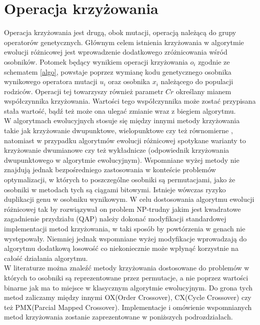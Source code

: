 \chapter{Operacja krzyżowania}\label{cha:pierwszyDokument}

Operacja krzyżowania jest drugą, obok mutacji, operacją należącą do grupy operatorów genetycznych. Głównym celem istnienia krzyżowania w algorytmie ewolucji różnicowej jest wprowadzenie dodatkowego zróżnicowania wśród osobników. Potomek będący wynikiem operacji krzyżowania $o_{i}$ zgodnie ze schematem \ref{algo}, powstaje poprzez wymianę kodu genetycznego osobnika wynikowego operatora mutacji $u_{i}$ oraz osobnika $x_{i}$ należącego do populacji rodziców. Operacji tej towarzyszy również parametr $C{r}$ określany mianem współczynnika krzyżowania. Wartości tego współczynnika może zostać przypisana stała wartość, bądź też może ona ulegać zmianie wraz z biegiem algorytmu. \\
W algorytmach ewolucyjnych stosuje się między innymi metody krzyżowania takie jak krzyżowanie dwupunktowe, wielopunktowe czy też równomierne \cite{diff2}, natomiast w przypadku algorytmów ewolucji różnicowej spotykane warianty to krzyżowanie dwumianowe czy też wykładnicze (odpowiednik krzyżowania dwupunktowego w algorytmie ewolucyjnym). Wspomniane wyżej metody nie znajdują jednak bezpośredniego zastosowania w konteście problemów optymalizacji, w których to poszczególne osobniki są permutacjami, jako że osobniki w metodach tych są ciągami bitowymi. Istnieje wówczas ryzyko duplikacji genu w osobniku wynikowym. W celu dostosowania algorytmu ewolucji różnicowej tak by rozwiązywał on problem NP-trudny jakim jest kwadratowe zagadnienie przydziału (QAP) należy dokonać modyfikacji standardowej implementacji metod krzyżowania, w taki sposób by powtórzenia w genach nie występowały. Niemniej jednak wspomniane wyżej modyfikacje wprowadzają do algorytmu dodatkową losowość co niekoniecznie może wpłynąć korzystnie na całość działania algorytmu. \\
W literaturze \cite{cross} można znaleźć metody krzyżowania dostosowane do problemów w których to osobniki są reprezentowane przez permutacje, a nie poprzez wartości binarne jak ma to miejsce w klasycznym algorytmie ewolucyjnym. Do grona tych metod zaliczamy między innymi OX(Order Crossover), CX(Cycle Crossover) czy też PMX(Parcial Mapped Crossover). Implementacje i omówienie wspomnianych metod krzyżowania zostanie zaprezentowane w poniższych podrozdziałach.

